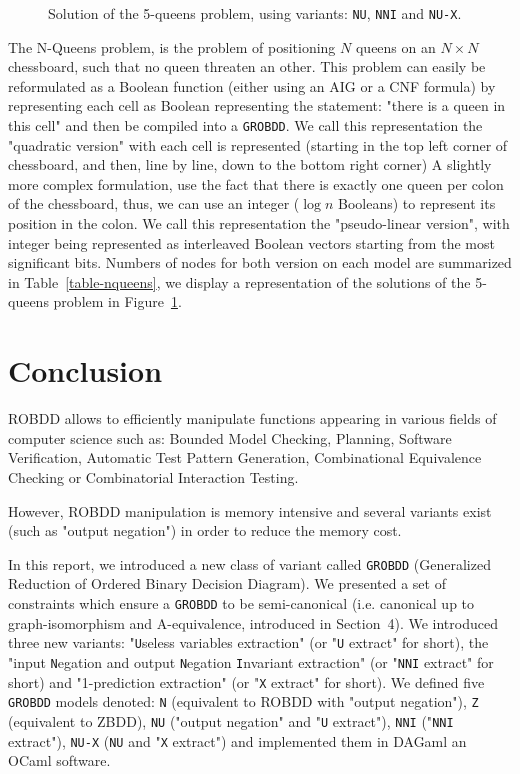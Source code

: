 \documentclass[a4paper,10pt]{article}
\newcommand{\includeframe}[4]{\makebox[#2\linewidth]{\texttt{[image: \#4]}}}
\newcommand{\Uextract}{"\texttt{U}seless variables extraction"}
\newcommand{\uextract}{"\texttt{U} extract"}
\newcommand{\NNIextract}{"input \texttt{N}egation and output \texttt{N}egation \texttt{I}nvariant extraction"}
\newcommand{\nniextract}{"\texttt{NNI} extract"}
\newcommand{\Xextract}{"1-prediction extraction"}
\newcommand{\xextract}{"\texttt{X} extract"}
\newcommand{\GroBdd}{\texttt{GROBDD}}
\begin{document}
\begin{figure}
\center
\includeframe{1}{0.9}{}{nqueens.pdf}
\caption{Solution of the 5-queens problem, using variants: \texttt{NU}, \texttt{NNI} and \texttt{NU-X}.}
\label{figure-nqueens}
\end{figure}

The N-Queens problem, is the problem of positioning $N$ queens on an $N\times N$ chessboard, such that no queen threaten an other.
This problem can easily be reformulated as a Boolean function (either using an AIG or a CNF formula) by representing each cell as Boolean representing the statement: "there is a queen in this cell" and then be compiled into a \GroBdd{}.
We call this representation the "quadratic version" with each cell is represented (starting in the top left corner of chessboard, and then, line by line, down to the bottom right corner)
A slightly more complex formulation, use the fact that there is exactly one queen per colon of the chessboard, thus, we can use an integer ($\log n$ Booleans) to represent its position in the colon.
We call this representation the "pseudo-linear version", with integer being represented as interleaved Boolean vectors starting from the most significant bits.
Numbers of nodes for both version on each model are summarized in Table~\ref{table-nqueens}, we display a representation of the solutions of the 5-queens problem in Figure~\ref{figure-nqueens}.



\section{Conclusion}

ROBDD allows to efficiently manipulate functions appearing in various fields of computer science such as: Bounded Model Checking, Planning, Software Verification, Automatic Test Pattern Generation, Combinational Equivalence Checking or Combinatorial Interaction Testing.

However, ROBDD manipulation is memory intensive and several variants exist (such as "output negation") in order to reduce the memory cost.

In this report, we introduced a new class of variant called \GroBdd{} (Generalized Reduction of Ordered Binary Decision Diagram).
We presented a set of constraints which ensure a \GroBdd{} to be semi-canonical (i.e. canonical up to graph-isomorphism and A-equivalence, introduced in Section~4).
We introduced three new variants: \Uextract{} (or \uextract{} for short), the \NNIextract{} (or \nniextract{} for short) and \Xextract{} (or \xextract{} for short).
We defined five \GroBdd{} models denoted: \texttt{N} (equivalent to ROBDD with "output negation"), \texttt{Z} (equivalent to ZBDD), \texttt{NU} ("output negation" and \uextract{}), \texttt{NNI} (\nniextract{}), \texttt{NU-X} (\texttt{NU} and \xextract{}) and implemented them in DAGaml\cite{DAGamlGitHub} an OCaml software.
\end{document}

